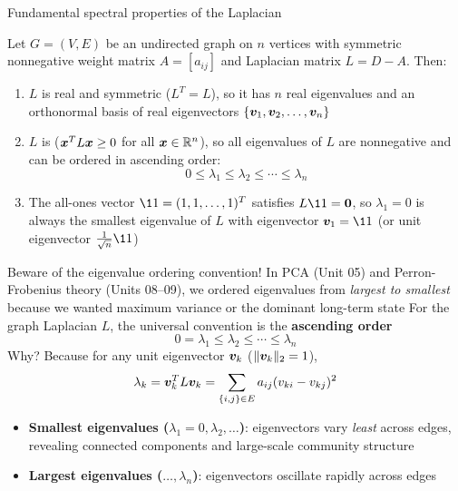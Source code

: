 \documentclass[aspectratio=169]{beamer}\usepackage[]{graphicx}\usepackage[]{xcolor}
\begin{document}
\begin{frame}{Fundamental spectral properties of the Laplacian}
\begin{importanttheorem}
\label{th:laplacian-spectrum}
Let $G = (V, E)$ be an undirected graph on $n$ vertices with symmetric nonnegative weight matrix $A = [a_{ij}]$ and Laplacian matrix $L = D - A$. Then:
\begin{enumerate}
\item $L$ is real and symmetric ($L^T = L$), so it has $n$ real eigenvalues and an orthonormal basis of real eigenvectors $\{\bm{v}_1, \bm{v}_2, \ldots, \bm{v}_n\}$
\item $L$ is  ($\bm{x}^T L \bm{x} \ge 0$ for all $\bm{x} \in \mathbb{R}^n$), so all eigenvalues of $L$ are nonnegative and can be ordered in ascending order:
\[
0 \le \lambda_1 \le \lambda_2 \le \cdots \le \lambda_n
\]
\item The all-ones vector $\11 = (1, 1, \ldots, 1)^T$ satisfies $L\11 = \b0$, so $\lambda_1 = 0$ is always the smallest eigenvalue of $L$ with eigenvector $\bv_1 = \11$ (or unit eigenvector $\frac{1}{\sqrt{n}}\11$)
\end{enumerate}
\end{importanttheorem}
\end{frame}


\begin{frame}{Beware of the eigenvalue ordering convention!}
In PCA (Unit 05) and Perron-Frobenius theory (Units 08--09), we ordered eigenvalues from \emph{largest to smallest} because we wanted maximum variance or the dominant long-term state
\vfill
For the graph Laplacian $L$, the universal convention is the \textbf{ascending order}
\[
0 = \lambda_1 \le \lambda_2 \le \cdots \le \lambda_n
\]
\vfill
Why? Because for any unit eigenvector $\bm{v}_k$ ($\|\bm{v}_k\|_2 = 1$),
\[
\lambda_k = \bm{v}_k^T L \bm{v}_k = \sum_{\{i, j\} \in E} a_{ij}(v_{ki} - v_{kj})^2
\]
\begin{itemize}
\item \textbf{Smallest eigenvalues ($\lambda_1 = 0, \lambda_2, \ldots$)}: eigenvectors vary \emph{least} across edges, revealing connected components and large-scale community structure
\item \textbf{Largest eigenvalues ($\ldots, \lambda_n$)}: eigenvectors oscillate rapidly across edges
\end{itemize}
\end{frame}
\end{document}
